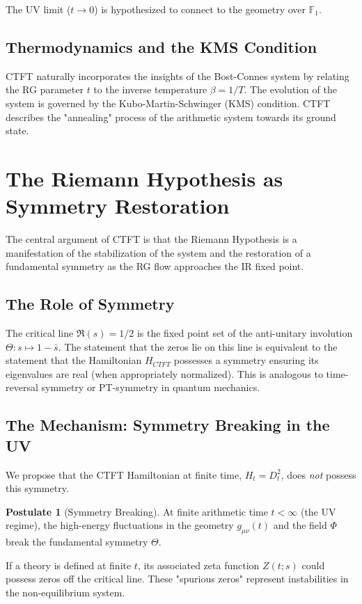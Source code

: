 \documentclass[11pt, a4paper]{article}
\theoremstyle{definition}
\newtheorem{postulate}{Postulate}
\newcommand{\F}{\mathbb{F}_1}
\begin{document}
The UV limit ($t\to 0$) is hypothesized to connect to the geometry over $\F$.

\subsection{Thermodynamics and the KMS Condition}
CTFT naturally incorporates the insights of the Bost-Connes system by relating the RG parameter $t$ to the inverse temperature $\beta = 1/T$. The evolution of the system is governed by the Kubo-Martin-Schwinger (KMS) condition. CTFT describes the "annealing" process of the arithmetic system towards its ground state.

\section{The Riemann Hypothesis as Symmetry Restoration}
The central argument of CTFT is that the Riemann Hypothesis is a manifestation of the stabilization of the system and the restoration of a fundamental symmetry as the RG flow approaches the IR fixed point.

\subsection{The Role of Symmetry}
The critical line $\Re(s) = 1/2$ is the fixed point set of the anti-unitary involution $\Theta: s \mapsto 1-\bar{s}$. The statement that the zeros lie on this line is equivalent to the statement that the Hamiltonian $H_{CTFT}$ possesses a symmetry ensuring its eigenvalues are real (when appropriately normalized). This is analogous to time-reversal symmetry or PT-symmetry in quantum mechanics.

\subsection{The Mechanism: Symmetry Breaking in the UV}
We propose that the CTFT Hamiltonian at finite time, $H_t = D_t^2$, does \textit{not} possess this symmetry.

\begin{postulate}[Symmetry Breaking]
At finite arithmetic time $t < \infty$ (the UV regime), the high-energy fluctuations in the geometry $g_{\mu\nu}(t)$ and the field $\Phi$ break the fundamental symmetry $\Theta$.
\end{postulate}

If a theory is defined at finite $t$, its associated zeta function $Z(t;s)$ could possess zeros off the critical line. These "spurious zeros" represent instabilities in the non-equilibrium system.
\end{document}

